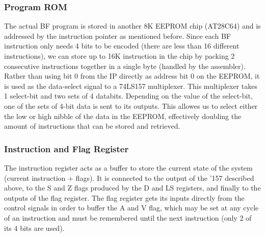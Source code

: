 \subsubsection{Program ROM}
The actual BF program is stored in another 8K EEPROM chip (AT28C64) and is addressed by the instruction pointer as mentioned before. Since each BF instruction only needs 4 bits to be encoded (there are less than 16 different instructions), we can store up to 16K instruction in the chip by packing 2 consecutive instructions together in a single byte (handled by the assembler). Rather than using bit 0 from the IP directly as address bit 0 on the EEPROM, it is used as the data-select signal to a 74LS157 multiplexer. This multiplexer takes 1 select-bit and two sets of 4 databits. Depending on the value of the select-bit, one of the sets of 4-bit data is sent to its outputs. This allowes us to select either the low or high nibble of the data in the EEPROM, effectively doubling the amount of instructions that can be stored and retrieved.

\subsubsection{Instruction and Flag Register}
The instruction register acts as a buffer to store the current state of the system (current instruction + flags). It is connected to the output of the '157 described above, to the S and Z flags produced by the D and LS registers, and finally to the outputs of the flag register. The flag register gets its inputs directly from the control signals in order to buffer the A and V flag, which may be set at any cycle of an instruction and must be remembered until the next instruction (only 2 of its 4 bits are used).
